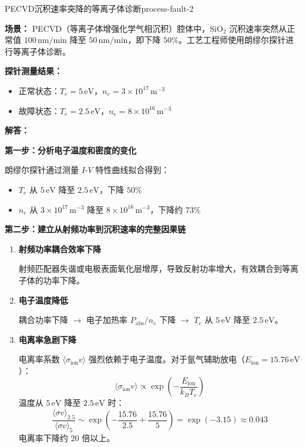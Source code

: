 \documentclass[12pt,a4paper,openany,oneside]{book}
\newcommand{\difficulty}[1]{\marginnote{\hfill\textcolor{coverMid!80}{\rule[-0.1em]{2pt}{0.9em}}\,\textcolor{coverMid}{\footnotesize\textbf{[#1]}}}}
\begin{document}
\begin{example}{PECVD沉积速率突降的等离子体诊断}{process-fault-2}
\difficulty{应用}

\textbf{场景：}
PECVD（等离子体增强化学气相沉积）腔体中，$\mathrm{SiO}_2$ 沉积速率突然从正常值 $100\,\mathrm{nm/min}$ 降至 $50\,\mathrm{nm/min}$，即下降 $50\%$。工艺工程师使用朗缪尔探针进行等离子体诊断。

\textbf{探针测量结果：}
\begin{itemize}
    \item 正常状态：$T_e = 5\,\mathrm{eV}$，$n_e = 3\times 10^{17}\,\mathrm{m}^{-3}$
    \item 故障状态：$T_e = 2.5\,\mathrm{eV}$，$n_e = 8\times 10^{16}\,\mathrm{m}^{-3}$
\end{itemize}

\tcblower
\textbf{解答：}

\textbf{第一步：分析电子温度和密度的变化}

朗缪尔探针通过测量 $I$-$V$ 特性曲线拟合得到：
\begin{itemize}
    \item $T_e$ 从 $5\,\mathrm{eV}$ 降至 $2.5\,\mathrm{eV}$，下降 $50\%$
    \item $n_e$ 从 $3\times 10^{17}\,\mathrm{m}^{-3}$ 降至 $8\times 10^{16}\,\mathrm{m}^{-3}$，下降约 $73\%$
\end{itemize}

\textbf{第二步：建立从射频功率到沉积速率的完整因果链}

\begin{enumerate}
    \item \textbf{射频功率耦合效率下降}
    
    射频匹配器失谐或电极表面氧化层增厚，导致反射功率增大，有效耦合到等离子体的功率下降。
    
    \item \textbf{电子温度降低}
    
    耦合功率下降 $\rightarrow$ 电子加热率 $P_{\text{abs}}/n_e$ 下降 $\rightarrow$ $T_e$ 从 $5\,\mathrm{eV}$ 降至 $2.5\,\mathrm{eV}$。
    
    \item \textbf{电离率急剧下降}
    
    电离率系数 $\langle \sigma_{\text{ion}} v \rangle$ 强烈依赖于电子温度。对于氩气辅助放电（$E_{\text{ion}} = 15.76\,\mathrm{eV}$）：
    \[
    \langle \sigma_{\text{ion}} v \rangle \propto \exp\left(-\frac{E_{\text{ion}}}{k_B T_e}\right)
    \]
    温度从 $5\,\mathrm{eV}$ 降至 $2.5\,\mathrm{eV}$ 时：
    \[
    \frac{\langle \sigma v \rangle_{2.5}}{\langle \sigma v \rangle_{5}} \sim \exp\left(-\frac{15.76}{2.5} + \frac{15.76}{5}\right) = \exp(-3.15) \approx 0.043
    \]
    电离率下降约 $20$ 倍以上。
    

\end{enumerate}
\end{example}
\end{document}
